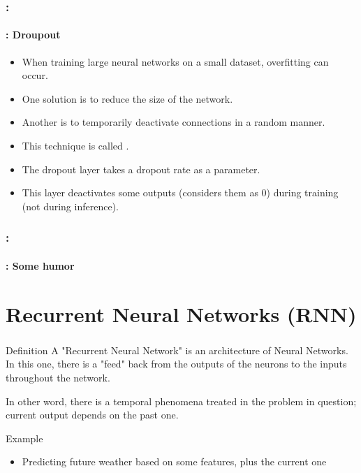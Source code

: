 \documentclass[xcolor=table]{beamer}
\begin{document}
\begin{frame}
	\frametitle{\insertshortsubtitle: \insertsection}
	\framesubtitle{\insertsubsection: Droupout}
	
	\begin{itemize}
		\item When training large neural networks on a small dataset, overfitting can occur.
		\item One solution is to reduce the size of the network.
		\item Another is to temporarily deactivate connections in a random manner.
		\item This technique is called .
		\item The dropout layer takes a dropout rate as a parameter.
		\item This layer deactivates some outputs (considers them as 0) during training (not during inference).
	\end{itemize}

\end{frame}


\begin{frame}
	\frametitle{\insertshortsubtitle: \insertsection}
	\framesubtitle{\insertsubsection: Some humor}


\end{frame}


\section{Recurrent Neural Networks (RNN)}

\begin{frame}
	\frametitle{\insertshortsubtitle}
	\framesubtitle{\insertsection}
	
	\begin{block}{Definition}
		\vspace{6pt}
		A "Recurrent Neural Network" is an architecture of Neural Networks. 
		In this one, there is a "feed" back from the outputs of the neurons to the inputs throughout the network. \cite{2006-sazli}
		
		\vspace{6pt}
		In other word, there is a temporal phenomena treated in the problem in question; current output depends on the past one.
		\vspace{6pt}
	\end{block}
	
	\begin{exampleblock}{Example}
		\begin{itemize}
			\item Predicting future weather based on some features, plus the current one
		\end{itemize}
	\end{exampleblock}
	
\end{frame}
\end{document}
